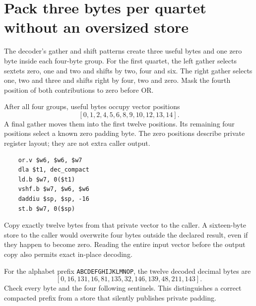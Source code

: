 \section{Pack three bytes per quartet without an oversized store}
The decoder's gather and shift patterns create three useful bytes and one zero byte
inside each four-byte group. For the first quartet, the left gather selects sextets
zero, one and two and shifts by two, four and six. The right gather selects one, two
and three and shifts right by four, two and zero. Mask the fourth position of both
contributions to zero before OR.

After all four groups, useful bytes occupy vector positions
\[
  [0,1,2,4,5,6,8,9,10,12,13,14].
\]
A final gather moves them into the first twelve positions. Its remaining four positions
select a known zero padding byte. The zero positions describe private register layout;
they are not extra caller output.

\begin{verbatim}
    or.v $w6, $w6, $w7
    dla $t1, dec_compact
    ld.b $w7, 0($t1)
    vshf.b $w7, $w6, $w6
    daddiu $sp, $sp, -16
    st.b $w7, 0($sp)
\end{verbatim}

Copy exactly twelve bytes from that private vector to the caller. A sixteen-byte store
to the caller would overwrite four bytes outside the declared result, even if they
happen to become zero. Reading the entire input vector before the output copy also
permits exact in-place decoding.

For the alphabet prefix \texttt{ABCDEFGHIJKLMNOP}, the twelve decoded decimal bytes
are
\[
  [0,16,131,16,81,135,32,146,139,48,211,143].
\]
Check every byte and the four following sentinels. This distinguishes a correct compacted
prefix from a store that silently publishes private padding.
